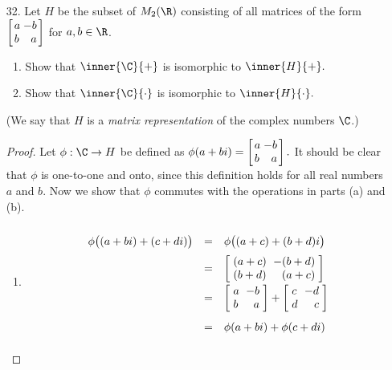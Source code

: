 \documentclass[letterpaper]{article}
\begin{document}
\begin{enumerate}
\item[32.] Let $H$ be the subset of $M_2(\R)$ consisting of all matrices of the form 
$\arraycolsep=1.4pt\def\arraystretch{1}
\left[\begin{array}{lr}
a & -b \\
b & a \\
\end{array} \right]$
for $a,b\in\R$. 
	\begin{enumerate}[label=\alph*.]
	\item Show that $\inner{\C}{+}$ is isomorphic to $\inner{H}{+}.$
	\item Show that $\inner{\C}{\cdot}$ is isomorphic to $\inner{H}{\cdot}.$
	\end{enumerate}
(We say that $H$ is a \emph{matrix representation} of the complex numbers $\C$.) 

\begin{proof} 
Let $\phi:\C\to H$ be defined as 
$\phi(a+bi)=
\arraycolsep=1.4pt\def\arraystretch{1}
\left[\begin{array}{lr}
a & -b \\
b & a \\
\end{array} \right].$ It should be clear that $\phi$ is one-to-one and onto, since this definition holds for all real numbers $a$ and $b$. Now we show that $\phi$ commutes with the operations in parts (a) and (b). 
	\begin{enumerate}[label=\alph*.]
	\item \[\def\arraystretch{2}
	\begin{array}{rcl}
	\phi\big((a+bi)+(c+di)\big)&=&\phi\big((a+c)+(b+d)i\big)\\
	&=&
		\arraycolsep=3pt\def\arraystretch{1}
		\left[\begin{array}{lr}
		(a+c) & -(b+d) \\
		(b+d) & (a+c) \\
		\end{array} \right]
		\\
	&=&
		\arraycolsep=3pt\def\arraystretch{1}
		\left[\begin{array}{lr}
		a & -b \\
		b & a  \\
		\end{array} \right]
		+
		\arraycolsep=3pt\def\arraystretch{1}
		\left[\begin{array}{lr}
		c & -d \\
		d & c  \\
		\end{array} \right]
		\\
	&=&\phi(a+bi)+\phi(c+di)\\
	\end{array}\]\qedwhite
	

\end{enumerate}
\end{proof}
\end{enumerate}
\end{document}
